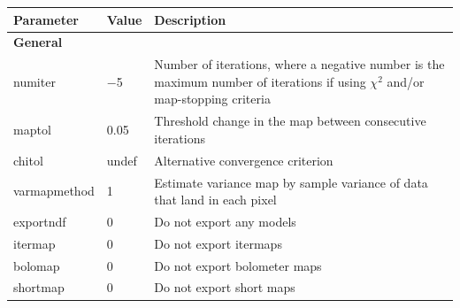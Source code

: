 \documentclass[twoside,11pt]{article}
\newenvironment{latexonly}{}{}
\renewcommand{\_}{\texttt{\symbol{95}}}
\begin{document}
\begin{latexonly}
\begin{table}[h]
\begin{center}
\begin{small}
\begin{tabular}{|p{2.5cm}|p{1.0cm}|p{11.2cm}|}
\hline
Parameter & Value & Description \\
\hline
\multicolumn{3}{|l|}{\textbf{General}}\\
\hline
numiter       & $-$5 & Number of iterations, where a negative number
                       is the maximum number of iterations
                       if using $\chi^2$ and/or map-stopping criteria \\
maptol        & 0.05 & Threshold change in the map between consecutive
                       iterations \\
chitol        & undef& Alternative convergence criterion \\
varmapmethod  &    1 & Estimate variance map by sample variance of data that
                       land in each pixel \\

exportndf     &    0 & Do not export any models \\
itermap       &    0 & Do not export itermaps \\
bolomap       &    0 & Do not export bolometer maps \\
shortmap      &    0 & Do not export short maps \\


\end{tabular}
\end{small}
\end{center}
\end{table}
\end{latexonly}
\end{document}
